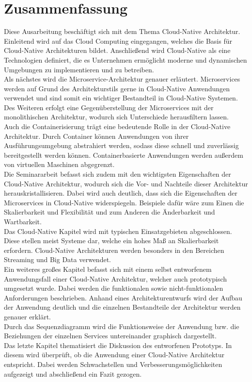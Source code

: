 \chapter*{Zusammenfassung}
Diese Ausarbeitung beschäftigt sich mit dem Thema Cloud-Native Architektur. Einleitend wird auf das Cloud Computing eingegangen, welches die Basis für Cloud-Native Architekturen bildet. Anschließend wird Cloud-Native als eine Technologien definiert, die es Unternehmen ermöglicht moderne und dynamischen Umgebungen zu implementieren und zu betreiben.\\
Als nächstes wird die Microservice-Architektur genauer erläutert. Microservices werden auf Grund des Architekturstils gerne in Cloud-Native Anwendungen verwendet und sind somit ein wichtiger Bestandteil in Cloud-Native Systemen. Des Weiteren erfolgt eine Gegenüberstellung der Microservices mit der monolithischen Architektur, wodurch sich Unterschiede herausfiltern lassen.\\
Auch die Containerisierung trägt eine bedeutende Rolle in der Cloud-Native Architektur. Durch Container können Anwendungen von ihrer Ausführungsumgebung abstrahiert werden, sodass diese schnell und zuverlässig bereitgestellt werden können. Containerbasierte Anwendungen werden außerdem von virtuellen Maschinen abgegrenzt.\\
Die Seminararbeit befasst sich zudem mit den wichtigsten Eigenschaften der Cloud-Native Architektur, wodurch sich die Vor- und Nachteile dieser Architektur herauskristallisieren. Dabei wird auch deutlich, dass sich die Eigenschaften der Microservices in Cloud-Native widerspiegeln. Beispiele dafür wäre zum Einen die Skalierbarkeit und Flexibilität und zum Anderen die Änderbarkeit und Wartbarkeit.\\
Das Cloud-Native Kapitel wird mit typischen Einsatzgebieten abgeschlossen. Diese stellen meist Systeme dar, welche ein hohes Maß an Skalierbarkeit erfordern. Cloud-Native Architekturen werden besonders in den Bereichen Streaming und Big Data verwendet.\\
Ein weiteres großes Kapitel befasst sich mit einem selbst entworfenem Anwendungsfall einer Cloud-Native Architektur, welcher auch prototypisch umgesetzt wurde. Dabei werden die funktionalen sowie nicht-funktionalen Anforderungen beschrieben. Anhand eines Architekturentwurfs wird der Aufbau der Anwendung deutlich und die einzelnen Bestandteile der Architektur werden genauer erklärt.\\
Durch das Sequenzdiagramm wird die Funktionsweise der Anwendung bzw. die Beziehungen der einzelnen Services untereinander graphisch dargestellt.\\
Das letzte Kapitel thematisiert die Diskussion des entworfenen Prototyps. In diesem wird überprüft, ob die Anwendung einer Cloud-Native Architektur entspricht. Dabei werden Schwachstellen und Verbesserungsmöglichkeiten aufgezeigt und abschließend ein Fazit gezogen.